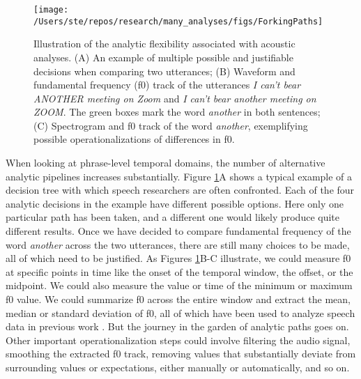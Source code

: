 \documentclass[Review,times,sageh]{sagej}
\begin{document}
\begin{figure}
\texttt{[image: /Users/ste/repos/research/many\_analyses/figs/ForkingPaths]} \caption{Illustration of the analytic flexibility associated with acoustic analyses. (A) An example of multiple possible and justifiable decisions when comparing two utterances; (B) Waveform and fundamental frequency (f0) track of the utterances \emph{I can't bear ANOTHER meeting on Zoom} and \emph{I can't bear another meeting on ZOOM}. The green boxes mark the word \emph{another} in both sentences; (C) Spectrogram and f0 track of the word \emph{another}, exemplifying possible operationalizations of differences in f0.}\label{fig:forkingPaths}
\end{figure}

When looking at phrase-level temporal domains, the number of alternative analytic pipelines increases substantially.
Figure \ref{fig:forkingPaths}A shows a typical example of a decision tree with which speech researchers are often confronted.
Each of the four analytic decisions in the example have different possible options.
Here only one particular path has been taken, and a different one would likely produce quite different results.
Once we have decided to compare fundamental frequency of the word \emph{another} across the two utterances, there are still many choices to be made, all of which need to be justified.
As Figures \ref{fig:forkingPaths}B-C illustrate, we could measure f0 at specific points in time like the onset of the temporal window, the offset, or the midpoint.
We could also measure the value or time of the minimum or maximum f0 value.
We could summarize f0 across the entire window and extract the mean, median or standard deviation of f0, all of which have been used to analyze speech data in previous work \citep[see][]{gordon2017acoustic}.
But the journey in the garden of analytic paths goes on.
Other important operationalization steps could involve filtering the audio signal, smoothing the extracted f0 track, removing values that substantially deviate from surrounding values or expectations, either manually or automatically, and so on.
\end{document}
